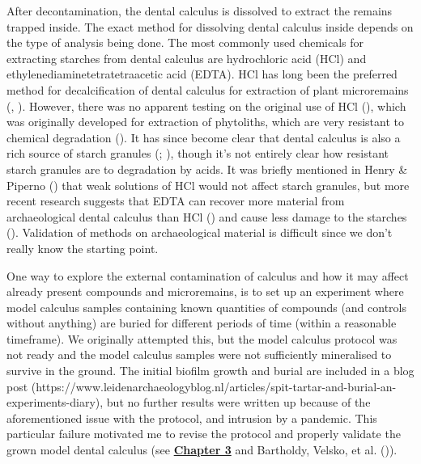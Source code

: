 \documentclass[
  b5paper,
]{book}
\begin{document}
After decontamination, the dental calculus is dissolved to extract the
remains trapped inside. The exact method for dissolving dental calculus
inside depends on the type of analysis being done. The most commonly
used chemicals for extracting starches from dental calculus are
hydrochloric acid (HCl) and ethylenediaminetetratetraacetic acid (EDTA).
HCl has long been the preferred method for decalcification of dental
calculus for extraction of plant microremains
(,
). However, there was
no apparent testing on the original use of HCl
(), which was
originally developed for extraction of phytoliths, which are very
resistant to chemical degradation
(). It has
since become clear that dental calculus is also a rich source of starch
granules (;
), though it's not entirely clear how resistant starch granules are
to degradation by acids. It was briefly mentioned in Henry \& Piperno
() that weak solutions of HCl
would not affect starch granules, but more recent research suggests that
EDTA can recover more material from archaeological dental calculus than
HCl () and cause
less damage to the starches
(). Validation of methods on archaeological material is difficult
since we don't really know the starting point.

One way to explore the external contamination of calculus and how it may
affect already present compounds and microremains, is to set up an
experiment where model calculus samples containing known quantities of
compounds (and controls without anything) are buried for different
periods of time (within a reasonable timeframe). We originally attempted
this, but the model calculus protocol was not ready and the model
calculus samples were not sufficiently mineralised to survive in the
ground. The initial biofilm growth and burial are included in a blog
post
(https://www.leidenarchaeologyblog.nl/articles/spit-tartar-and-burial-an-experiments-diary),
but no further results were written up because of the aforementioned
issue with the protocol, and intrusion by a pandemic. This particular
failure motivated me to revise the protocol and properly validate the
grown model dental calculus (see \hyperref[byoc-valid]{\textbf{Chapter
3}} and Bartholdy, Velsko, et al.
()).
\end{document}
